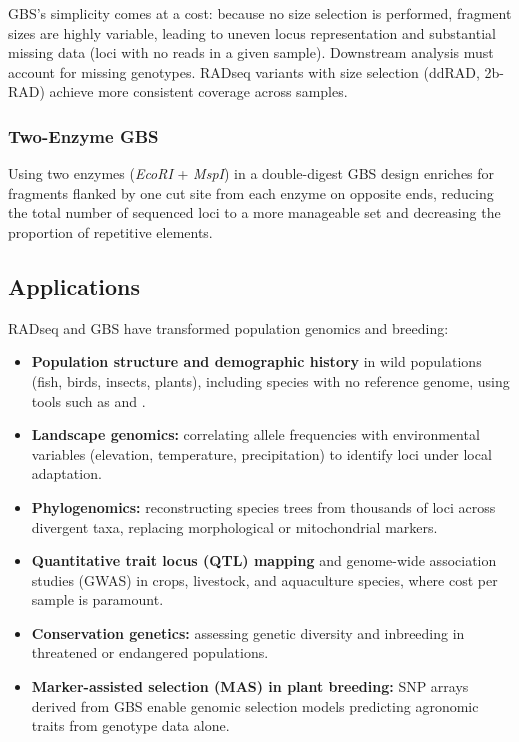 \begin{warningbox}[title={GBS vs RADseq: Missing Data}]
GBS's simplicity comes at a cost: because no size selection is performed, fragment sizes are highly variable, leading to uneven locus representation and substantial missing data (loci with no reads in a given sample). Downstream analysis must account for missing genotypes. RADseq variants with size selection (ddRAD, 2b-RAD) achieve more consistent coverage across samples.
\end{warningbox}

\subsubsection{Two-Enzyme GBS}
Using two enzymes (\textit{EcoRI} + \textit{MspI}) in a double-digest GBS design enriches for fragments flanked by one cut site from each enzyme on opposite ends, reducing the total number of sequenced loci to a more manageable set and decreasing the proportion of repetitive elements.

\subsection{Applications}
\label{subsec:radseq:applications}

RADseq and GBS have transformed population genomics and breeding:

\begin{itemize}[itemsep=3pt]
  \item \textbf{Population structure and demographic history} in wild populations (fish, birds, insects, plants), including species with no reference genome, using tools such as  and .
  \item \textbf{Landscape genomics:} correlating allele frequencies with environmental variables (elevation, temperature, precipitation) to identify loci under local adaptation.
  \item \textbf{Phylogenomics:} reconstructing species trees from thousands of loci across divergent taxa, replacing morphological or mitochondrial markers.
  \item \textbf{Quantitative trait locus (QTL) mapping} and genome-wide association studies (GWAS) in crops, livestock, and aquaculture species, where cost per sample is paramount.
  \item \textbf{Conservation genetics:} assessing genetic diversity and inbreeding in threatened or endangered populations.
  \item \textbf{Marker-assisted selection (MAS) in plant breeding:} SNP arrays derived from GBS enable genomic selection models predicting agronomic traits from genotype data alone.
\end{itemize}


